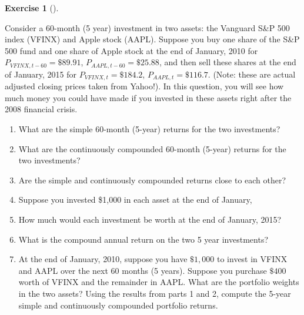 \documentclass[
  letterpaper,
  DIV=11,
  numbers=noendperiod]{scrreprt}
\providecommand{\tightlist}{%
  \setlength{\itemsep}{0pt}\setlength{\parskip}{0pt}}\usepackage{longtable,booktabs,array}
\theoremstyle{definition}
\newtheorem{exercise}{Exercise}[chapter]
\theoremstyle{definition}
\theoremstyle{remark}
\begin{document}
\begin{exercise}[]\protect\hypertarget{exr-exercise0107}{}\label{exr-exercise0107}

Consider a 60-month (5 year) investment in two assets: the Vanguard S\&P
500 index (VFINX) and Apple stock (AAPL). Suppose you buy one share of
the S\&P 500 fund and one share of Apple stock at the end of January,
2010 for \(P_{VFINX,t-60}=\$89.91\), \(P_{AAPL,t-60}=\$25.88\), and then
sell these shares at the end of January, 2015 for
\(P_{VFINX,t}=\$184.2\), \(P_{AAPL,t}=\$116.7\). (Note: these are actual
adjusted closing prices taken from Yahoo!). In this question, you will
see how much money you could have made if you invested in these assets
right after the 2008 financial crisis.

\begin{enumerate}
\def\labelenumi{\arabic{enumi}.}
\tightlist
\item
  What are the simple 60-month (5-year) returns for the two investments?
\item
  What are the continuously compounded 60-month (5-year) returns for the
  two investments?
\item
  Are the simple and continuously compounded returns close to each
  other?
\item
  Suppose you invested \$1,000 in each asset at the end of January,
\item
  How much would each investment be worth at the end of January, 2015?
\item
  What is the compound annual return on the two 5 year investments?
\item
  At the end of January, 2010, suppose you have \(\$1,000\) to invest in
  VFINX and AAPL over the next 60 months (5 years). Suppose you purchase
  \(\$400\) worth of VFINX and the remainder in AAPL. What are the
  portfolio weights in the two assets? Using the results from parts 1
  and 2, compute the 5-year simple and continuously compounded portfolio
  returns.
\end{enumerate}

\end{exercise}
\end{document}
